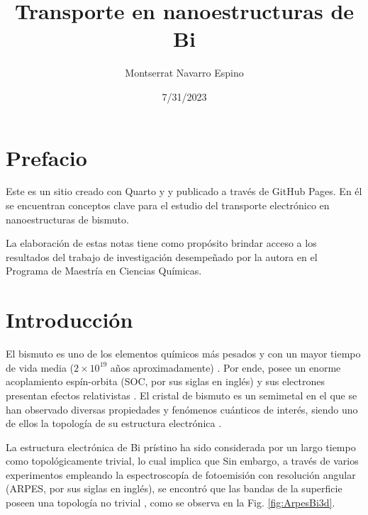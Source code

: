 \documentclass[
  letterpaper,
  DIV=11,
  numbers=noendperiod]{scrreprt}
\title{Transporte en nanoestructuras de Bi}
\author{Montserrat Navarro Espino}
\date{7/31/2023}
\renewcommand*\contentsname{Table of contents}
\newcommand\contentsname{Table of contents}
\begin{document}
\maketitle
\ifdefined\Shaded\renewenvironment{Shaded}{\begin{tcolorbox}[boxrule=0pt, borderline west={3pt}{0pt}{shadecolor}, breakable, interior hidden, frame hidden, enhanced, sharp corners]}{\end{tcolorbox}}\fi

\renewcommand*\contentsname{Table of contents}
{
\hypersetup{linkcolor=}
\setcounter{tocdepth}{2}
\tableofcontents
}

\hypertarget{prefacio}{%
\chapter*{Prefacio}\label{prefacio}}

Este es un sitio creado con Quarto y y publicado a través de GitHub
Pages. En él se encuentran conceptos clave para el estudio del
transporte electrónico en nanoestructuras de bismuto.

La elaboración de estas notas tiene como propósito brindar acceso a los
resultados del trabajo de investigación desempeñado por la autora en el
Programa de Maestría en Ciencias Químicas.


\hypertarget{introducciuxf3n}{%
\chapter{Introducción}\label{introducciuxf3n}}

El bismuto es uno de los elementos químicos más pesados y con un mayor
tiempo de vida media (\(2 \times 10 ^{19}\) años aproximadamente)
\cite{Kanatzidis2020,Marcillac2003}. Por ende, posee un enorme
acoplamiento espín-orbita (SOC, por sus siglas en inglés) y sus
electrones presentan efectos relativistas
\cite{Tatewaki2017, Bucinsky2016}. El cristal de bismuto es un semimetal
en el que se han observado diversas propiedades y fenómenos cuánticos de
interés, siendo uno de ellos la topología de su estructura electrónica
\cite{Ito2016}.

La estructura electrónica de Bi prístino ha sido considerada por un
largo tiempo como topológicamente trivial, lo cual implica que Sin
embargo, a través de varios experimentos empleando la espectroscopía de
fotoemisión con resolución angular (ARPES, por sus siglas en inglés), se
encontró que las bandas de la superficie poseen una topología no trivial
\cite{Ohtsubo2013,Perfetti2015,}, como se observa en la Fig.
\ref{fig:ArpesBi3d}.
\end{document}

